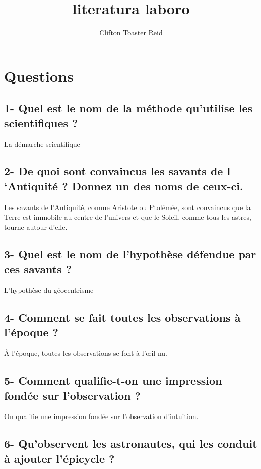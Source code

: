 \documentclass{article}
\author{Clifton Toaster Reid}
\title{literatura laboro}
\begin{document}
\maketitle
\tableofcontents
\pagebreak

\section{Questions}

\subsection*{1- Quel est le nom de la méthode qu’utilise les scientifiques ?}

La démarche scientifique

\subsection*{2- De quoi sont convaincus les savants de l ‘Antiquité ? Donnez un des noms de ceux-ci.}

Les savants de l'Antiquité, comme Aristote ou Ptolémée, sont convaincus que la Terre est immobile au centre de l'univers et que le Soleil, comme tous les astres, tourne autour d'elle.

\subsection*{3- Quel est le nom de l’hypothèse défendue par ces savants ?}

L'hypothèse du géocentrisme

\subsection*{4- Comment se fait toutes les observations à l’époque ?}

À l'époque, toutes les observations se font à l'œil nu.

\subsection*{5- Comment qualifie-t-on une impression fondée sur l’observation ?}

On qualifie une impression fondée sur l'observation d'intuition.

\subsection*{6- Qu’observent les astronautes, qui les conduit à ajouter l’épicycle ?}
\end{document}
